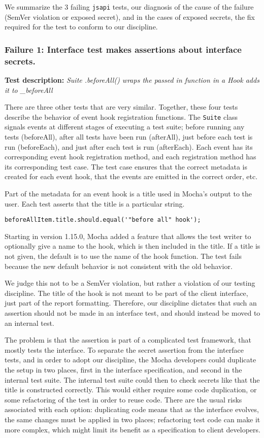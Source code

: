 We summarize the 3 failing {\tt jsapi} tests, our diagnosis of the cause of
the failure (SemVer violation or exposed secret), and in the cases of
exposed secrets, the fix required for the test to conform to our
discipline.

\subsubsection{Failure 1: Interface test makes assertions about
interface secrets.}
{\bf Test description: } {\em Suite .beforeAll() wraps the passed in
function in a Hook adds it to \_beforeAll}
\label{sec:failure1}

There are three other tests that are very similar. Together, these
four tests describe the behavior of event hook registration
functions. The {\tt Suite} class signals events at different stages of
executing a test suite; before running any tests (beforeAll), after
all tests have been run (afterAll), just before each test is run
(beforeEach), and just after each test is run (afterEach). Each event
has its corresponding event hook registration method, and each
registration method has its corresponding test case. The test case
ensures that the correct metadata is created for each event hook, that
the events are emitted in the correct order, etc.

Part of the metadata for an event hook is a title used in Mocha's
output to the user. Each test asserts that the title is a particular
string.

{\small
\begin{verbatim}
beforeAllItem.title.should.equal('"before all" hook');
\end{verbatim}
}

Starting in version 1.15.0, Mocha added a feature that allows the test
writer to optionally give a name to the hook, which is then included
in the title. If a title is not given, the default is to use the name
of the hook function. The test fails because the new default behavior
is not consistent with the old behavior.

We judge this not to be a SemVer violation, but rather a violation of
our testing discipline. The title of the hook is not meant to be part
of the client interface, just part of the report
formatting. Therefore, our discipline dictates that such an assertion
should not be made in an interface test, and should instead be moved
to an internal test.

The problem is that the assertion is part of a complicated test
framework, that mostly tests the interface. To separate the
secret assertion from the interface tests, and in order to adopt our
discipline, the Mocha developers could duplicate the setup in two places,
first in the interface specification, and second in the
internal test suite. The internal test suite could then to check secrets
like that the title is constructed correctly. This would either require
some code duplication, or some refactoring of the test in order to reuse
code. There are the usual risks associated with each option: duplicating
code means that as the interface evolves, the same changes must be
applied in two places; refactoring test code can make it more complex,
which might limit its benefit as a specification to client developers.

